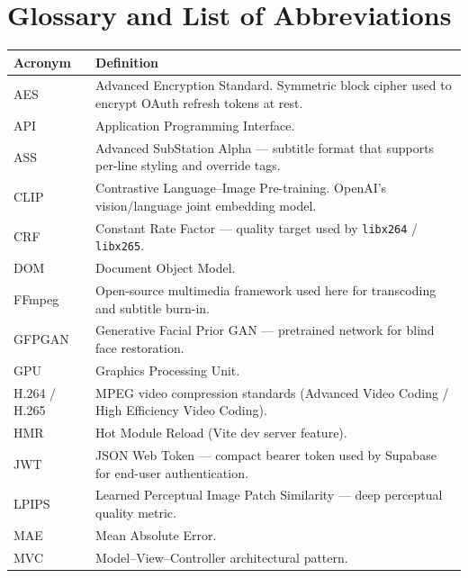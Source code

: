 \chapter*{Glossary and List of Abbreviations}
\thispagestyle{plain}

\vspace{0.5cm}

\begin{tabular}{p{3.0cm} p{12.5cm}}
\toprule
\textbf{Acronym} & \textbf{Definition} \\
\midrule
AES        & Advanced Encryption Standard. Symmetric block cipher used to encrypt OAuth refresh tokens at rest. \\
API        & Application Programming Interface. \\
ASS        & Advanced SubStation Alpha --- subtitle format that supports per-line styling and override tags. \\
CLIP       & Contrastive Language--Image Pre-training. OpenAI's vision/language joint embedding model. \\
CRF        & Constant Rate Factor --- quality target used by \texttt{libx264} / \texttt{libx265}. \\
DOM        & Document Object Model. \\
FFmpeg     & Open-source multimedia framework used here for transcoding and subtitle burn-in. \\
GFPGAN     & Generative Facial Prior GAN --- pretrained network for blind face restoration. \\
GPU        & Graphics Processing Unit. \\
H.264 / H.265 & MPEG video compression standards (Advanced Video Coding / High Efficiency Video Coding). \\
HMR        & Hot Module Reload (Vite dev server feature). \\
JWT        & JSON Web Token --- compact bearer token used by Supabase for end-user authentication. \\
LPIPS      & Learned Perceptual Image Patch Similarity --- deep perceptual quality metric. \\
MAE        & Mean Absolute Error. \\
MVC        & Model--View--Controller architectural pattern. \\

\end{tabular}
